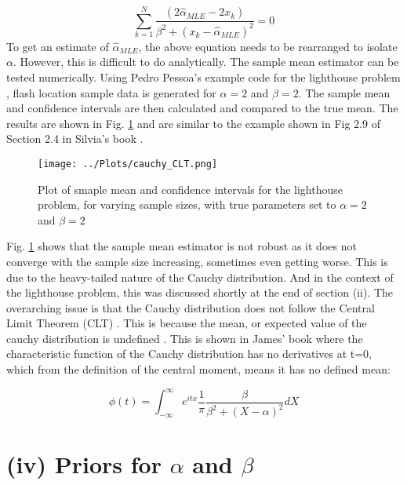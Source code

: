 \documentclass[12pt]{report} %
\begin{document}
\begin{equation}
    \sum_{k=1}^{N} \frac{(2\hat{\alpha}_{MLE} - 2x_{k})}{\beta^{2} + (x_{k} - \hat{\alpha}_{MLE})^{2}} = 0
\end{equation}
\newline
To get an estimate of $\hat{\alpha}_{MLE}$, the above equation needs to be rearranged to isolate $\alpha$. However, this is difficult to do analytically. The sample mean estimator can be tested numerically. Using Pedro Pessoa's example code for the lighthouse problem \cite{pessoa_lighthouse}, flash location sample data is generated for $\alpha = 2$ and $\beta = 2$. The sample mean and confidence intervals are then calculated and compared to the true mean. The results are shown in Fig. \ref{fig:sample_mean} and are similar to the example shown in Fig 2.9 of Section 2.4 in Silvia's book \cite{sivia_data_analysis}.

\begin{figure}[h]
\centering
\texttt{[image: ../Plots/cauchy\_CLT.png]}
\caption{Plot of smaple mean and confidence intervals for the lighthouse problem, for varying sample sizes, with true parameters set to $\alpha = 2$ and $\beta = 2$}
\label{fig:sample_mean}
\end{figure}

Fig. \ref{fig:sample_mean} shows that the sample mean estimator is not robust as it does not converge with the sample size increasing, sometimes even getting worse. This is due to the heavy-tailed nature of the Cauchy distribution. And in the context of the lighthouse problem, this was discussed shortly at the end of section (ii). The overarching issue is that the Cauchy distribution does not follow the Central Limit Theorem (CLT) \cite[p34]{sivia_data_analysis}. This is because the mean, or expected value of the cauchy distribution is undefined \cite[p84]{FJames2006}. This is shown in James' book \cite[p34]{FJames2006} where the characteristic function of the Cauchy distribution has no derivatives at t=0, which from the definition of the central moment, means it has no defined mean:

\begin{equation}
    \phi(t) = \int_{-\infty}^{\infty} e^{itx} \frac{1}{\pi} \frac{\beta}{\beta^{2} + (X - \alpha)^{2}} dX
\end{equation}


\section*{(iv) Priors for $\alpha$ and $\beta$}
\end{document}
